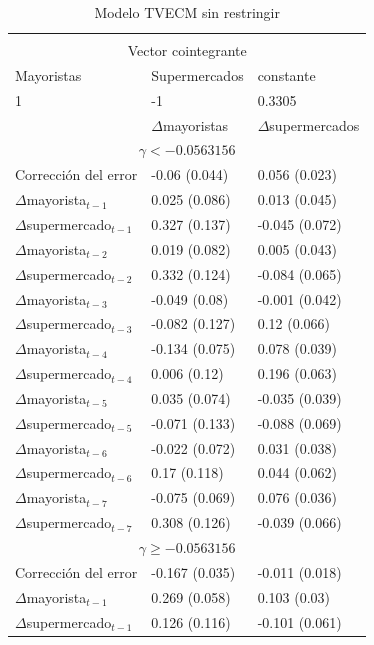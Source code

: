 \begin{table}[H]
\centering
\caption{Modelo TVECM sin restringir}
\begin{tabular}{@{}lll@{}}
\toprule \\
\multicolumn{3}{c}{Vector cointegrante} \\
\midrule 
Mayoristas & Supermercados & constante \\ 
1             & -1 & 0.3305 \\
\midrule
 & $\Delta$mayoristas & $\Delta$supermercados \\ 
\midrule 
\multicolumn{3}{c}{$\gamma<-0.0563156$} \\
\midrule 
Corrección del error & -0.06 (0.044) & 0.056 (0.023) \\
$\Delta$mayorista$_{t-1}$ & 0.025 (0.086) & 0.013 (0.045) \\
$\Delta$supermercado$_{t-1}$ & 0.327 (0.137) & -0.045 (0.072) \\
$\Delta$mayorista$_{t-2}$ & 0.019 (0.082) & 0.005 (0.043) \\
$\Delta$supermercado$_{t-2}$ & 0.332 (0.124) & -0.084 (0.065) \\
$\Delta$mayorista$_{t-3}$ & -0.049 (0.08) & -0.001 (0.042) \\
$\Delta$supermercado$_{t-3}$ & -0.082 (0.127) & 0.12 (0.066) \\
$\Delta$mayorista$_{t-4}$ & -0.134 (0.075) & 0.078 (0.039) \\
$\Delta$supermercado$_{t-4}$ & 0.006 (0.12) & 0.196 (0.063) \\
$\Delta$mayorista$_{t-5}$ & 0.035 (0.074) & -0.035 (0.039) \\
$\Delta$supermercado$_{t-5}$ & -0.071 (0.133) & -0.088 (0.069) \\
$\Delta$mayorista$_{t-6}$ & -0.022 (0.072) & 0.031 (0.038) \\
$\Delta$supermercado$_{t-6}$ & 0.17 (0.118) & 0.044 (0.062) \\
$\Delta$mayorista$_{t-7}$ & -0.075 (0.069) & 0.076 (0.036) \\
$\Delta$supermercado$_{t-7}$ & 0.308 (0.126) & -0.039 (0.066) \\
\midrule 
\multicolumn{3}{c}{$\gamma\geq -0.0563156$} \\
\midrule 
Corrección del error & -0.167 (0.035) & -0.011 (0.018) \\
$\Delta$mayorista$_{t-1}$ & 0.269 (0.058) & 0.103 (0.03) \\
$\Delta$supermercado$_{t-1}$ & 0.126 (0.116) & -0.101 (0.061) \\

\end{tabular}
\end{table}
